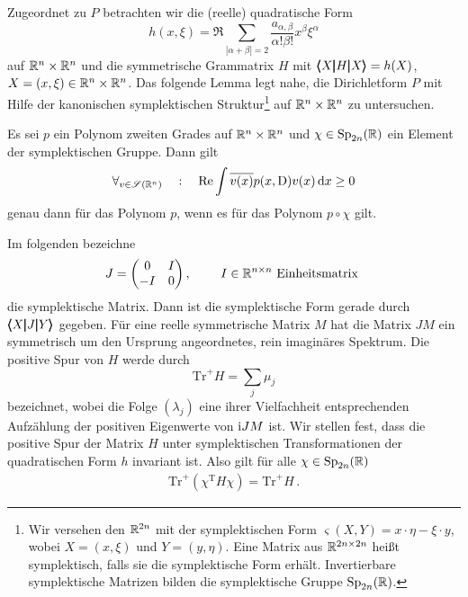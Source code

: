 Zugeordnet zu $P$ betrachten wir die (reelle) quadratische Form
\begin{equation}
  h(x,\xi) = \Re  \sum_{|\alpha+\beta|= 2} \frac{a_{\alpha,\beta}}{\alpha!\beta!} x^\beta\xi^\alpha
\end{equation}
auf $\mathbb R^n\times\mathbb R^n$ und die symmetrische Grammatrix $H$ mit $\pmb\langle X\pmb|H\pmb|X\pmb\rangle=h(X)$, $X=(x,\xi)\in\mathbb R^n\times\mathbb R^n$.  Das folgende Lemma legt nahe, die Dirichletform $P$ mit Hilfe der kanonischen symplektischen Struktur\footnote{Wir versehen den $\mathbb R^{2n}$ mit der symplektischen Form
$\varsigma(X,Y) = x\cdot \eta - \xi\cdot y$, wobei $X=(x,\xi)$ und $Y=(y,\eta)$. Eine Matrix aus $\mathbb R^{2n\times 2n}$ heißt symplektisch, falls sie die symplektische Form erhält. Invertierbare symplektische Matrizen bilden die symplektische Gruppe $\mathrm{Sp}_{2n}(\mathbb R)$.} auf $\mathbb R^n\times\mathbb R^n$ zu untersuchen.
\begin{lem}
Es sei $p$ ein Polynom zweiten Grades auf $\mathbb R^n\times\mathbb R^n$ und $\chi\in\mathrm{Sp}_{2n}(\mathbb R)$ ein Element der symplektischen Gruppe. Dann gilt
\begin{align}
\forall_{v\in\mathscr S(\mathbb R^n)} \quad:\quad \operatorname{Re} \int \overline{v(x)}p(x,\mathrm D)v(x)\,\mathrm d x\ge 0
\end{align}
genau dann für das Polynom $p$, wenn es für das Polynom $p\circ \chi$ gilt.
\end{lem}
Im folgenden bezeichne
\begin{align}
J=\begin{pmatrix}
0 & I\\
-I& 0 
\end{pmatrix},\qquad\text{ $ I \in\mathbb R^{n\times n}$  Einheitsmatrix }
\end{align}
die symplektische Matrix. Dann ist die symplektische Form gerade durch $\pmb\langle X\pmb|J\pmb|Y\pmb\rangle$ gegeben. Für eine reelle symmetrische Matrix $M$ hat  die Matrix $JM$ ein symmetrisch um den Ursprung angeordnetes, rein imaginäres Spektrum. Die positive Spur von $H$ werde durch
\begin{equation}
   {\mathrm{Tr}}^+ H = \sum_j\mu_j 
\end{equation}
bezeichnet, wobei die Folge $(\lambda_j)$ eine ihrer Vielfachheit entsprechenden Aufzählung der positiven Eigenwerte von $\mathrm i JM$ ist. Wir stellen fest, dass die positive Spur
der Matrix $H$ unter symplektischen Transformationen der quadratischen Form $h$ invariant ist. Also gilt für alle $\chi\in\mathrm{Sp}_{2n}(\mathbb R)$
\begin{align}
\mathrm{Tr}^+(\chi^\mathrm{T}H\chi) = \mathrm{Tr}^+ H\,.
\end{align}

